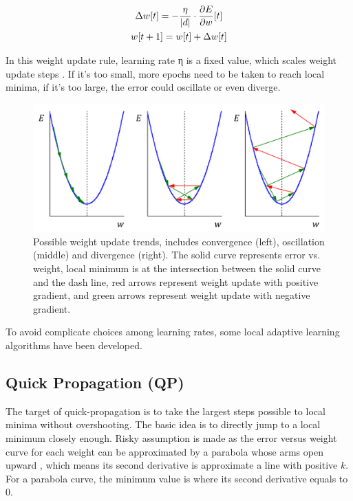 \documentclass[procedia]{easychair}
\begin{document}
\begin{gather}
    \Delta w[t] = - \frac{\eta}{|d|} \cdot \frac{ \partial E }{ \partial w } [t] \notag \\
    w[ t + 1 ] = w[t] + \Delta w[t] \notag
\end{gather}

In this weight update rule, learning rate η is a fixed value, which scales weight update steps \cite{riedmiller1993direct}.  If it’s too small, more epochs need to be taken to reach local minima, if it’s too large, the error could oscillate or even diverge.

\begin{figure}[tb]
    \begin{centering}
        \includegraphics[scale=0.5]{../../pic/bp.png}
        \caption{Possible weight update trends, includes convergence (left), oscillation (middle) and divergence (right).  The solid curve represents error vs. weight, local minimum is at the intersection between the solid curve and the dash line, red arrows represent weight update with positive gradient, and green arrows represent weight update with negative gradient.}
        \label{fig:bp}
	\end{centering}
\end{figure}

To avoid complicate choices among learning rates, some local adaptive learning algorithms have been developed.

\subsection{Quick Propagation (QP)}

The target of quick-propagation is to take the largest steps possible to local minima without overshooting.  The basic idea is to directly jump to a local minimum closely enough.  Risky assumption is made as the error versus weight curve for each weight can be approximated by a parabola whose arms open upward \cite{fahlman1988empirical}, which means its second derivative is approximate a line with positive $k$.  For a parabola curve, the minimum value is where its second derivative equals to 0.
\end{document}

